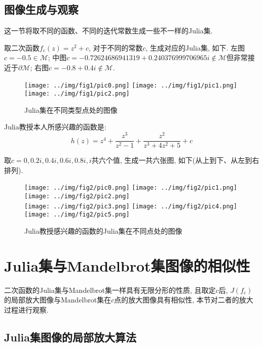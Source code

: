 \documentclass[UTF8]{ctexart}
\begin{document}
\subsection{图像生成与观察}

这一节将取不同的函数、不同的迭代常数生成一些不一样的Julia集.

取二次函数$f_c(z)=z^2+c$, 对于不同的常数$c$, 生成对应的Julia集, 如下. 左图$c=-0.5\in\mathcal{M}$; 中图$c=-0.72624686941319+0.240376999706965i\notin \mathcal{M}$但非常接近于$\partial \mathcal{M}$; 右图$c=-0.8+0.4i\notin \mathcal{M}$.

\begin{figure}[H]
    \centering
    \texttt{[image: ../img/fig1/pic0.png]}
    \texttt{[image: ../img/fig1/pic1.png]}
    \texttt{[image: ../img/fig1/pic2.png]}
    \caption{Julia集在不同类型点处的图像}
\end{figure}

Julia教授本人所感兴趣的函数是: \cite{2019ComplexAnalysis} 
\begin{equation*}
    h(z)=z^4+\frac{z^3}{z^2-1}+\frac{z^2}{z^3+4z^2+5}+c
\end{equation*}

取$c=0,0.2i,0.4i,0.6i,0.8i,i$共六个值, 生成一共六张图, 如下(从上到下、从左到右排列).

\begin{figure}[H]
    \centering
    \texttt{[image: ../img/fig2/pic0.png]}
    \texttt{[image: ../img/fig2/pic1.png]}
    \texttt{[image: ../img/fig2/pic2.png]}
    \\
    \centering
    \vspace{3pt} \texttt{[image: ../img/fig2/pic3.png]}
    \texttt{[image: ../img/fig2/pic4.png]}
    \texttt{[image: ../img/fig2/pic5.png]}
    \caption{Julia教授感兴趣的函数的Julia集在不同点处的图像}
\end{figure}

\section{Julia集与Mandelbrot集图像的相似性}

二次函数的Julia集与Mandelbrot集一样具有无限分形的性质, 且取定$c$后, $J(f_c)$的局部放大图像与Mandelbrot集在$c$点的放大图像具有相似性, 本节对二者的放大过程进行观察. 

\subsection{Julia集图像的局部放大算法}
\end{document}
